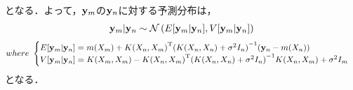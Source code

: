 \documentclass[11pt,a4j]{jarticle}
\begin{document}
      となる．よって，${\bf y}_m$の${\bf y}_n$に対する予測分布は，
      \begin{align}
        {\bf y}_m | {\bf y}_n \sim \mathcal{N}\left( E[{\bf y}_m | {\bf y}_n], V[{\bf y}_m | {\bf y}_n] \right) 
      \end{align}
      \begin{align}          
        where ~ 
        \begin{cases}
          E[{\bf y}_m | {\bf y}_n] = m(X_m) + {K(X_n,X_m)}^{\mathrm{T}} {( K(X_n,X_n) + \sigma^2 I_n )} ^{-1} ( {\bf y}_n - m(X_n) ) \\
          V[{\bf y}_m | {\bf y}_n] = K(X_m,X_m) - {K(X_n,X_m)}^{\mathrm{T}} { ( K(X_n,X_n) + \sigma^2 I_n ) }^{-1} K(X_n,X_m) + \sigma^2 I_m
        \end{cases} \nonumber
      \end{align}
      となる．
    
\end{document}
